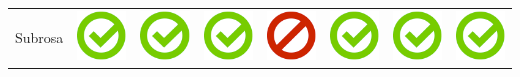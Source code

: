\documentclass[10pt,foldmark,tumble]{leaflet}
\begin{document}
\begin{center}
{{\begin{tabular}{ L{2cm} | C{2cm} | C{2cm} | C{2cm} | C{2cm} | C{2cm} | C{2cm} | C{2cm} }
Subrosa & \includegraphics[scale=0.1]{pics/haken.png} & \includegraphics[scale=0.1]{pics/haken.png} & \includegraphics[scale=0.1]{pics/haken.png} & \includegraphics[scale=0.1]{pics/nohaken.png} & \includegraphics[scale=0.1]{pics/haken.png} & \includegraphics[scale=0.1]{pics/haken.png} & \includegraphics[scale=0.1]{pics/haken.png} \tabularnewline

\end{tabular}}}
\end{center}
\end{document}
